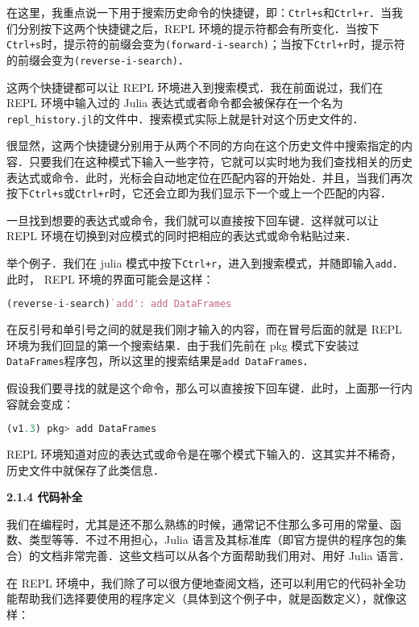 在这里，我重点说一下用于搜索历史命令的快捷键，即：\verb|Ctrl+s|和\verb|Ctrl+r|．当我们分别按下这两个快捷键之后，REPL 环境的提示符都会有所变化．当按下\verb|Ctrl+s|时，提示符的前缀会变为\verb|(forward-i-search)|；当按下\verb|Ctrl+r|时，提示符的前缀会变为\verb|(reverse-i-search)|．

这两个快捷键都可以让 REPL 环境进入到搜索模式．我在前面说过，我们在 REPL 环境中输入过的 Julia 表达式或者命令都会被保存在一个名为\verb|repl_history.jl|的文件中．搜索模式实际上就是针对这个历史文件的．

很显然，这两个快捷键分别用于从两个不同的方向在这个历史文件中搜索指定的内容．只要我们在这种模式下输入一些字符，它就可以实时地为我们查找相关的历史表达式或命令．此时，光标会自动地定位在匹配内容的开始处．并且，当我们再次按下\verb|Ctrl+s|或\verb|Ctrl+r|时，它还会立即为我们显示下一个或上一个匹配的内容．

一旦找到想要的表达式或命令，我们就可以直接按下回车键．这样就可以让 REPL 环境在切换到对应模式的同时把相应的表达式或命令粘贴过来．

举个例子．我们在 julia 模式中按下\verb|Ctrl+r|，进入到搜索模式，并随即输入\verb|add|．此时， REPL 环境的界面可能会是这样：

\begin{lstlisting}[language=julia]
(reverse-i-search)`add': add DataFrames
\end{lstlisting}

在反引号和单引号之间的就是我们刚才输入的内容，而在冒号后面的就是 REPL 环境为我们回显的第一个搜索结果．由于我们先前在 pkg 模式下安装过\verb|DataFrames|程序包，所以这里的搜索结果是\verb|add DataFrames|．

假设我们要寻找的就是这个命令，那么可以直接按下回车键．此时，上面那一行内容就会变成：

\begin{lstlisting}[language=julia]
(v1.3) pkg> add DataFrames
\end{lstlisting}

REPL 环境知道对应的表达式或命令是在哪个模式下输入的．这其实并不稀奇，历史文件中就保存了此类信息．

\textbf{2.1.4 代码补全}

我们在编程时，尤其是还不那么熟练的时候，通常记不住那么多可用的常量、函数、类型等等．不过不用担心，Julia 语言及其标准库（即官方提供的程序包的集合）的文档非常完善．这些文档可以从各个方面帮助我们用对、用好 Julia 语言．

在 REPL 环境中，我们除了可以很方便地查阅文档，还可以利用它的代码补全功能帮助我们选择要使用的程序定义（具体到这个例子中，就是函数定义），就像这样：

